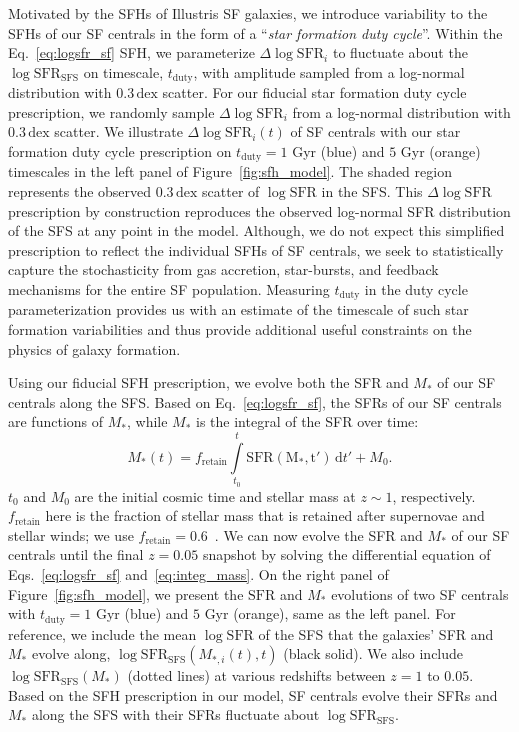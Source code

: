 \documentclass[12pt, letterpaper, preprint, tighten]{aastex62}
\newcommand{\edt}[1]{{\color{dred}{\bf} #1}}
\newcommand{\beq}{\begin{equation}}
\newcommand{\eeq}{\end{equation}}
\newcommand{\logsfr}{\log\mathrm{SFR}}
\newcommand{\logsfrsfs}{\log\mathrm{SFR}_\mathrm{SFS}}
\begin{document}
Motivated by the SFHs of Illustris SF galaxies, we introduce variability
to the SFHs of our SF centrals in the form of a ``\emph{star formation duty cycle}''.
Within the Eq.~\ref{eq:logsfr_sf} SFH, we parameterize $\Delta \logsfr_i$ to
fluctuate about the $\logsfrsfs$ on timescale, $t_\mathrm{duty}$, with
amplitude sampled from a log-normal distribution with $0.3\,\mathrm{dex}$
scatter. For our fiducial star formation duty cycle prescription, we randomly
sample $\Delta \logsfr_i$ from a log-normal distribution with
\edt{$0.3\,\mathrm{dex}$ scatter}.
We illustrate $\Delta \logsfr_i(t)$ of SF centrals with our star formation
duty cycle prescription on $t_\mathrm{duty}=1$ Gyr (blue) and $5$ Gyr (orange)
timescales in the left panel of Figure~\ref{fig:sfh_model}.
The shaded region represents the observed $0.3\,\mathrm{dex}$ scatter of
$\logsfr$ in the SFS. This $\Delta \logsfr$ prescription by construction
reproduces the observed log-normal SFR distribution of the SFS
at any point in the model. Although, we do not expect this simplified
prescription to reflect the individual SFHs of SF centrals,
we seek to statistically capture the stochasticity from gas accretion,
star-bursts, and feedback mechanisms for the entire SF population.
Measuring $t_\mathrm{duty}$ in the duty cycle parameterization
provides us with an estimate of the timescale of such star formation
variabilities and thus provide additional useful constraints on the
physics of galaxy formation.

Using our fiducial SFH prescription, we evolve both the SFR and $M_*$
of our SF centrals along the SFS. Based on Eq.~\ref{eq:logsfr_sf},
the SFRs of our SF centrals are functions of $M_*$, while $M_*$
is the integral of the SFR over time:
\beq \label{eq:integ_mass}
M_*(t) = f_\mathrm{retain} \int\limits_{t_0}^{t} \mathrm{SFR(M_*, t')}\,\mathrm{d}t' + M_0.
\eeq
$t_0$ and $M_0$ are the initial cosmic time and stellar mass at $z \sim 1$,
respectively. $f_\mathrm{retain}$ here is the fraction of stellar mass
that is retained after supernovae and stellar winds; we use
$f_\mathrm{retain} = 0.6$~\citep{wetzel2013}. We can now evolve the SFR and
$M_*$ of our SF centrals until the final $z=0.05$ snapshot by
solving the differential equation of Eqs.~\ref{eq:logsfr_sf} and~\ref{eq:integ_mass}.
On the right panel of Figure~\ref{fig:sfh_model}, we present the
$\mathrm{SFR}$ and $M_*$ evolutions of two SF centrals with
$t_\mathrm{duty}=1$ Gyr (blue) and $5$ Gyr (orange), same
as the left panel. For reference, we include the mean $\logsfr$ of the SFS
that the galaxies' SFR and $M_*$ evolve along, $\logsfrsfs(M_{*,i}(t), t)$
(black solid). We also include $\logsfrsfs(M_*)$ (dotted lines) at various
redshifts between $z = 1$ to $0.05$. Based on the SFH prescription in our
model, SF centrals evolve their SFRs and $M_*$ along the SFS
with their SFRs fluctuate about $\logsfrsfs$.
\end{document}
